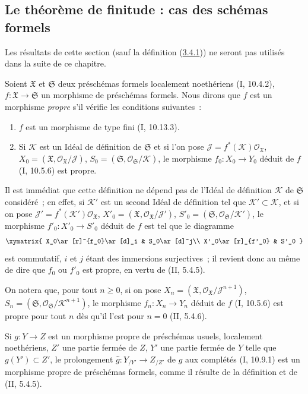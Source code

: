 \subsection{Le théorème de finitude : cas des schémas formels}
\label{subsection:III.3.4-fr}

Les résultats de cette section (sauf la définition
(\hyperref[III.3.4.1-fr]{3.4.1})) ne seront pas utilisés dans la suite de ce
chapitre.

\begin{env}[3.4.1]
\label{III.3.4.1-fr}
Soient $\mathfrak X$ et $\mathfrak S$ deux préschémas formels localement
noethériens (I, 10.4.2), $f:\mathfrak X\to\mathfrak S$ un morphisme de
préschémas formels. Nous dirons que $f$ est un morphisme \emph{propre} s'il
vérifie les conditions suivantes~:
\begin{enumerate}
\item[$1^\circ$] $f$ est un morphisme de type fini (I, 10.13.3).
\item[$2^\circ$] Si $\mathcal K$ est un Idéal de définition de $\mathfrak S$
et si l'on pose
$\mathcal J=f^*(\mathcal K)\mathcal O_{\mathfrak X}$,
$X_0=(\mathfrak X,\mathcal O_{\mathfrak X}/\mathcal J)$,
$S_0=(\mathfrak S,\mathcal O_{\mathfrak S}/\mathcal K)$, le morphisme
$f_0:X_0\to Y_0$ déduit de $f$ (I, 10.5.6) est propre.
\end{enumerate}

Il est immédiat que cette définition ne dépend pas de l'Idéal de définition
$\mathcal K$ de $\mathfrak S$ considéré~; en effet, si $\mathcal K'$ est un
second Idéal de définition tel que $\mathcal K'\subset\mathcal K$, et si on
pose $\mathcal J'=f^*(\mathcal K')\mathcal O_{\mathfrak X}$,
$X'_0=(\mathfrak X,\mathcal O_{\mathfrak X}/\mathcal J')$,
$S'_0=(\mathfrak S,\mathcal O_{\mathfrak S}/\mathcal K')$, le morphisme
$f'_0:X'_0\to S'_0$ déduit de $f$ est tel que le diagramme
\[
\xymatrix{
X_0\ar[r]^{f_0}\ar[d]_i & S_0\ar[d]^j\\
X'_0\ar[r]_{f'_0} & S'_0
}
\]
est commutatif, $i$ et $j$ étant des immersions surjectives~; il revient donc
au même de dire que $f_0$ ou $f'_0$ est propre, en vertu de (II, 5.4.5).

On notera que, pour tout $n\geq0$, si on pose
$X_n=(\mathfrak X,\mathcal O_{\mathfrak X}/\mathcal J^{n+1})$,
$S_n=(\mathfrak S,\mathcal O_{\mathfrak S}/\mathcal K^{n+1})$, le morphisme
$f_n:X_n\to Y_n$ déduit de $f$ (I, 10.5.6) est propre pour tout $n$ dès qu'il
l'est pour $n=0$ (II, 5.4.6).

Si $g:Y\to Z$ est un morphisme propre de préschémas usuels, localement
noethériens, $Z'$ une partie fermée de $Z$, $Y'$ une partie fermée de $Y$
telle que $g(Y')\subset Z'$, le prolongement
$\widehat g:Y_{/Y'}\to Z_{/Z'}$ de $g$ aux complétés (I, 10.9.1) est un
morphisme propre de préschémas formels, comme il résulte de la définition et
de (II, 5.4.5).


\end{env}
